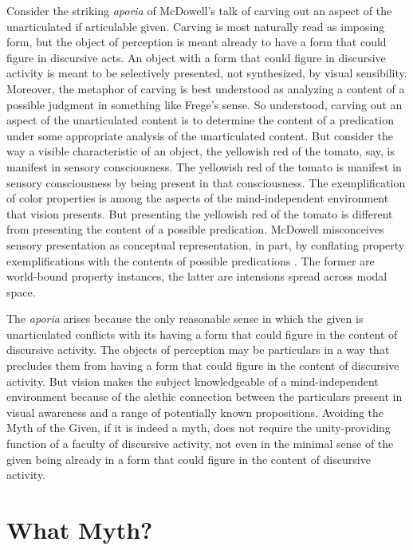 \documentclass[12pt]{article}
\begin{document}
Consider the striking \emph{aporia} of McDowell's talk of carving out an aspect of the unarticulated if articulable given. Carving is most naturally read as imposing form, but the object of perception is meant already to have a form that could figure in discursive acts. An object with a form that could figure in discursive activity is meant to be selectively presented, not synthesized, by visual sensibility. Moreover, the metaphor of carving is best understood as analyzing a content of a possible judgment in something like Frege's \citeyearpar[§64]{Frege:1884fk} sense. So understood, carving out an aspect of the unarticulated content is to determine the content of a predication under some appropriate analysis of the unarticulated content. But consider the way a visible characteristic of an object, the yellowish red of the tomato, say, is manifest in sensory consciousness. The yellowish red of the tomato is manifest in sensory consciousness by being present in that consciousness. The exemplification of color properties is among the aspects of the mind-independent environment that vision presents. But presenting the yellowish red of the tomato is different from presenting the content of a possible predication. McDowell misconceives sensory presentation as conceptual representation, in part, by conflating property exemplifications with the contents of possible predications \citep[see][for a similar criticism of the Woodbridge Lectures]{Johnston:2006uq}. The former are world-bound property instances, the latter are intensions spread across modal space.

The \emph{aporia} arises because the only reasonable sense in which the given is unarticulated conflicts with its having a form that could figure in the content of discursive activity. The objects of perception may be particulars in a way that precludes them from having a form that could figure in the content of discursive activity. But vision makes the subject knowledgeable of a mind-independent environment because of the alethic connection between the particulars present in visual awareness and a range of potentially known propositions. Avoiding the Myth of the Given, if it is indeed a myth, does not require the unity-providing function of a faculty of discursive activity, not even in the minimal sense of the given being already in a form that could figure in the content of discursive activity.



\section{What Myth?} %
\label{sec:what_myth_}
\end{document}
